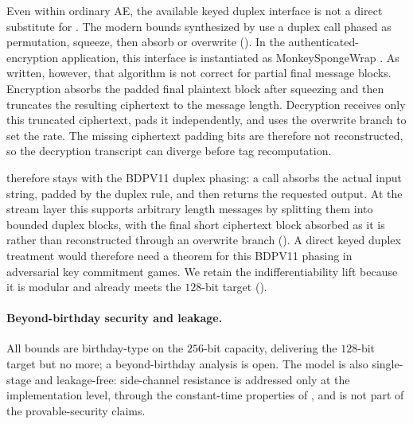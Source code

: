 Even within ordinary AE, the available keyed duplex interface is not a direct
substitute for \TW{}. The modern bounds synthesized by \cite{Men23} use a duplex
call phased as permutation, squeeze, then absorb or overwrite
(\cite[Sec.~3.4, Table~1]{Men23}). In the authenticated-encryption application,
this interface is instantiated as \textsf{MonkeySpongeWrap} \cite[Alg.~8]{Men23}.
As written, however, that algorithm is not correct for partial final message
blocks. Encryption absorbs the padded final plaintext block after squeezing and
then truncates the resulting ciphertext to the message length. Decryption
receives only this truncated ciphertext, pads it independently, and uses the
overwrite branch to set the rate. The missing ciphertext padding bits are
therefore not reconstructed, so the decryption transcript can diverge before tag
recomputation.

\TW{} therefore stays with the BDPV11 duplex phasing: a call absorbs the actual
input string, padded by the duplex rule, and then returns the requested output.
At the stream layer this supports arbitrary length messages by splitting them
into bounded duplex blocks, with the final short ciphertext block absorbed as it
is rather than reconstructed through an overwrite branch (). A
direct keyed duplex treatment would therefore need a theorem for this BDPV11
phasing in adversarial key commitment games. We retain the indifferentiability
lift because it is modular and already meets the $128$-bit target
().

\paragraph{Beyond-birthday security and leakage.}
All bounds are birthday-type on the $256$-bit capacity, delivering the
$128$-bit target but no more; a beyond-birthday analysis is open. The model is
also single-stage and leakage-free: side-channel resistance is addressed only at
the implementation level, through the constant-time properties of
, and is not part of the provable-security claims.
